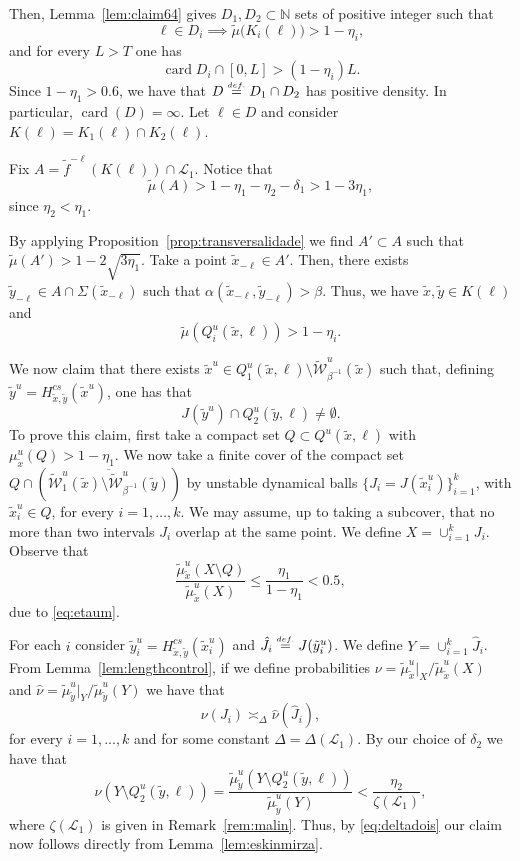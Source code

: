 \documentclass[a4paper,11pt,reqno]{amsart}
\newcommand{\N}{{\mathbb N}}
\newcommand{\cL}{{\mathcal L}}
\newcommand{\cW}{{\mathcal W}}
\newcommand{\eqdef}{\stackrel{\scriptscriptstyle\textrm def.}{=}}
\newcommand{\tix}{\tilde{x}}
\newcommand{\tif}{\tilde{f}}
\newcommand{\tm}{\tilde{\mu}}
\newcommand{\w}{\widetilde{\cW}}
\theoremstyle{definition}
\begin{document}


    Then, Lemma~\ref{lem:claim64} gives $D_1, D_2\subset\N$ sets of positive integer such that 
    \[
    \ell\in D_i\implies \tm\big(K_i(\ell)\big)>1-\eta_i,
    \]
    and for every $L>T$ one has 
    \[
    \operatorname{card} D_i\cap [0,L]>(1-\eta_i)L.
    \]
Since $1-\eta_1>0.6$, we have that $D\eqdef D_1\cap D_2$ has positive density. In particular, $\operatorname{card}(D)=\infty$. Let $\ell\in D$ and consider $K(\ell)=K_1(\ell)\cap K_2(\ell)$. 
    
    Fix $A=\tif^{-\ell}(K(\ell))\cap\cL_1$. Notice that
    \[
    \tm(A)>1 - \eta_1 - \eta_2 - \delta_1 >1-3\eta_1,
    \]
    since $\eta_2<\eta_1$.
    
    By applying Proposition~\ref{prop:transversalidade} we find $A'\subset A$ such that $\tm(A')>1-2\sqrt{3\eta_1}$. Take a point $\tix_{-\ell}\in A'$. Then, there exists $\tilde{y}_{-\ell}\in A\cap \Sigma(\tix_{-\ell})$ such that $\alpha(\tix_{-\ell},\tilde{y}_{-\ell})>\beta$. Thus, we have $\tix,\tilde{y}\in K(\ell)$ and 
    \[
    \tm\left(Q^u_i(\tix,\ell)\right)>1-\eta_i.
    \]

    We now claim that there exists $\tix^u\in Q^u_1(\tix,\ell)\setminus\w^u_{\beta^{-1}}(\tix)$ such that, defining $\tilde{y}^u=H^{cs}_{\tix,\tilde{y}}(\tix^u)$, one has that 
    \[
    J(\tilde{y}^u)\cap Q^u_2(\tilde{y},\ell)\neq\emptyset.
    \]
    To prove this claim, first take a compact set $Q\subset Q^u(\tix,\ell)$ with $\mu^u_{\tix}(Q)>1-\eta_1$. We now take a finite cover of the compact set $Q\cap\left(\overline{\w^u_1(\tix)\setminus\w^u_{\beta^{-1}}(\tilde{y})}\right)$ by unstable dynamical balls $\{J_i=J(\tix^u_i)\}_{i=1}^k$, with $\tix^u_i\in Q$, for every $i=1,\dots,k$. We may assume, up to taking a subcover, that no more than two intervals $J_i$ overlap at the same point. We define $X=\cup_{i=1}^kJ_i$. Observe that 
    \[
    \frac{\tm^u_{\tix}(X\setminus Q)}{\tm^u_{\tix}(X)}\leq\frac{\eta_1}{1-\eta_1}<0.5,
    \]
    due to \eqref{eq:etaum}.

    For each $i$ consider $\tilde{y}^u_i=H^{cs}_{\tix,\tilde{y}}(\tix^u_i)$ and $\hat{J}_i\eqdef J(\tilde{y}^u_i)$. We define $Y=\cup_{i=1}^k\hat{J}_i$. From Lemma~\ref{lem:lengthcontrol}, if we define probabilities $\nu=\tm^u_{\tix}|_X/\tm^u_{\tix}(X)$ and $\hat{\nu}=\tm^u_{\tilde{y}}|_Y/\tm^u_{\tilde{y}}(Y)$ we have that 
    \[
    \nu(J_i)\asymp_{\Delta}\hat{\nu}(\hat{J}_i),
    \]
    for every $i=1,...,k$ and for some constant $\Delta=\Delta(\cL_1)$. By our choice of $\delta_2$ we have that
     \[
     \hat{\nu}(Y\setminus Q^u_2(\tilde{y},\ell))=\frac{\tm^u_{\tilde{y}}(Y\setminus Q^u_2(\tilde{y},\ell))}{\tm^u_{\tilde{y}}(Y)}<\frac{\eta_2}{\zeta(\cL_1)},
     \]
     where $\zeta(\cL_1)$ is given in Remark~\ref{rem:malin}. Thus, by \eqref{eq:deltadois} our claim now follows directly from Lemma~\ref{lem:eskinmirza}.
\end{document}

